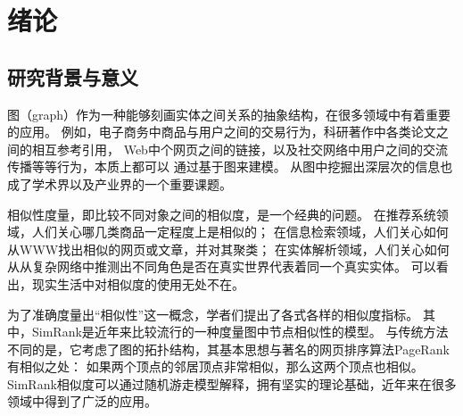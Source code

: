 \documentclass[master]{njuthesis}
\begin{document}
%

\tableofcontents



\mainmatter

\chapter{绪论}\label{chapter_introduction}

\section{研究背景与意义}
图（graph）作为一种能够刻画实体之间关系的抽象结构，在很多领域中有着重要的应用。
例如，电子商务中商品与用户之间的交易行为，科研著作中各类论文之间的相互参考引用，
Web中个网页之间的链接，以及社交网络中用户之间的交流传播等等行为，本质上都可以
通过基于图来建模。 从图中挖掘出深层次的信息也成了学术界以及产业界的一个重要课题。

相似性度量，即比较不同对象之间的相似度，是一个经典的问题。
在推荐系统\cite{fouss2007random}领域，人们关心哪几类商品一定程度上是相似的；
在信息检索\cite{dean1999finding}领域，人们关心如何从WWW找出相似的网页或文章，并对其聚类；
在实体解析\cite{bhattacharya2006entity}领域，人们关心如何从从复杂网络中推测出不同角色是否在真实世界代表着同一个真实实体。
可以看出，现实生活中对相似度的使用无处不在。

为了准确度量出“相似性”这一概念，学者们提出了各式各样的相似度指标。
其中，SimRank\cite{jeh2002simrank}是近年来比较流行的一种度量图中节点相似性的模型。
与传统方法不同的是，它考虑了图的拓扑结构，其基本思想与著名的网页排序算法PageRank\cite{page1999pagerank}有相似之处：
如果两个顶点的邻居顶点非常相似，那么这两个顶点也相似。
SimRank相似度可以通过随机游走模型解释，拥有坚实的理论基础，近年来在很多领域中得到了广泛的应用。
\end{document}
